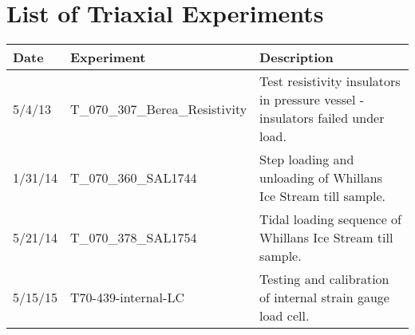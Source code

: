 \chapter{List of Triaxial Experiments}

\setlength\LTleft{0pt}
\setlength\LTright{0pt}
\begin{landscape}
\tiny
\begin{longtable} {l l l}
Date & Experiment & Description\\
\hline
\hline
5/4/13 & T\_070\_307\_Berea\_Resistivity & Test resistivity insulators in pressure vessel - insulators failed under load.\\
1/31/14 & T\_070\_360\_SAL1744 & Step loading and unloading of Whillans Ice Stream till sample.\\
5/21/14 & T\_070\_378\_SAL1754 & Tidal loading sequence of Whillans Ice Stream till sample.\\
5/15/15 & T70-439-internal-LC & Testing and calibration of internal strain gauge load cell.\\
\end{longtable}
\end{landscape}